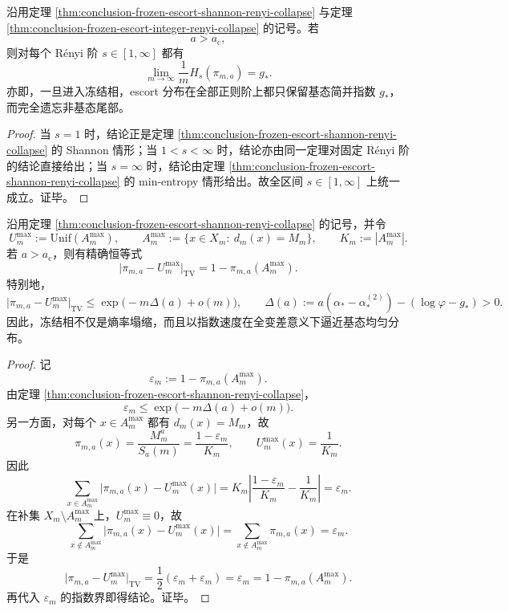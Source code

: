 \begin{corollary}\label{cor:conclusion-frozen-escort-all-renyi-collapse}
沿用定理 \ref{thm:conclusion-frozen-escort-shannon-renyi-collapse} 与定理 \ref{thm:conclusion-frozen-escort-integer-renyi-collapse} 的记号。若
\[
a>a_{\mathrm c},
\]
则对每个 Rényi 阶 \(s\in[1,\infty]\) 都有
\[
\lim_{m\to\infty}\frac{1}{m}H_s(\pi_{m,a})=g_\ast.
\]
亦即，一旦进入冻结相，escort 分布在全部正则阶上都只保留基态简并指数 \(g_\ast\)，而完全遗忘非基态尾部。
\end{corollary}
\begin{proof}
当 \(s=1\) 时，结论正是定理 \ref{thm:conclusion-frozen-escort-shannon-renyi-collapse} 的 Shannon 情形；当 \(1<s<\infty\) 时，结论亦由同一定理对固定 Rényi 阶的结论直接给出；当 \(s=\infty\) 时，结论由定理 \ref{thm:conclusion-frozen-escort-shannon-renyi-collapse} 的 min-entropy 情形给出。故全区间 \(s\in[1,\infty]\) 上统一成立。证毕。
\end{proof}

\begin{theorem}[冻结相到基态均匀分布的精确全变差刚性]\label{thm:conclusion-frozen-escort-tv-rigidity}
沿用定理 \ref{thm:conclusion-frozen-escort-shannon-renyi-collapse} 的记号，并令
\[
U_m^{\max}:=\mathrm{Unif}(A_m^{\max}),
\qquad
A_m^{\max}:=\{x\in X_m:\ d_m(x)=M_m\},
\qquad
K_m:=|A_m^{\max}|.
\]
若 \(a>a_{\mathrm c}\)，则有精确恒等式
\[
\bigl|\pi_{m,a}-U_m^{\max}\bigr|_{\mathrm{TV}}
=
1-\pi_{m,a}(A_m^{\max}).
\]
特别地，
\[
\bigl|\pi_{m,a}-U_m^{\max}\bigr|_{\mathrm{TV}}
\le
\exp\!\bigl(-m\Delta(a)+o(m)\bigr),
\qquad
\Delta(a):=a(\alpha_\ast-\alpha_\ast^{(2)})-(\log\varphi-g_\ast)>0.
\]
因此，冻结相不仅是熵率塌缩，而且以指数速度在全变差意义下逼近基态均匀分布。
\end{theorem}
\begin{proof}
记
\[
\varepsilon_m:=1-\pi_{m,a}(A_m^{\max}).
\]
由定理 \ref{thm:conclusion-frozen-escort-shannon-renyi-collapse}，
\[
\varepsilon_m\le \exp\!\bigl(-m\Delta(a)+o(m)\bigr).
\]
另一方面，对每个 \(x\in A_m^{\max}\) 都有 \(d_m(x)=M_m\)，故
\[
\pi_{m,a}(x)=\frac{M_m^a}{S_a(m)}=\frac{1-\varepsilon_m}{K_m},
\qquad
U_m^{\max}(x)=\frac{1}{K_m}.
\]
因此
\[
\sum_{x\in A_m^{\max}}\bigl|\pi_{m,a}(x)-U_m^{\max}(x)\bigr|
=
K_m\left|\frac{1-\varepsilon_m}{K_m}-\frac{1}{K_m}\right|
=
\varepsilon_m.
\]
在补集 \(X_m\setminus A_m^{\max}\) 上，\(U_m^{\max}\equiv 0\)，故
\[
\sum_{x\notin A_m^{\max}}\bigl|\pi_{m,a}(x)-U_m^{\max}(x)\bigr|
=
\sum_{x\notin A_m^{\max}}\pi_{m,a}(x)
=
\varepsilon_m.
\]
于是
\[
\bigl|\pi_{m,a}-U_m^{\max}\bigr|_{\mathrm{TV}}
=
\frac12\left(\varepsilon_m+\varepsilon_m\right)
=
\varepsilon_m
=
1-\pi_{m,a}(A_m^{\max}).
\]
再代入 \(\varepsilon_m\) 的指数界即得结论。证毕。
\end{proof}
